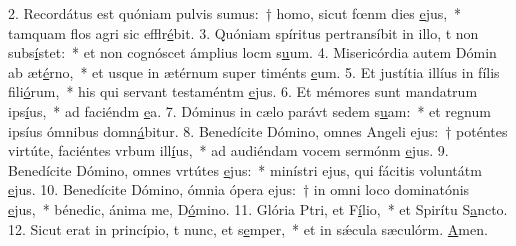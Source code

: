 2. Recordátus est quóniam pulvis sumus:~† homo, sicut fœnm dies \uline{e}jus,~* tamquam flos agri sic efflr\uline{é}bit.
3. Quóniam spíritus pertransíbit in illo, t non subs\uline{í}stet:~* et non cognóscet ámplius locm s\uline{u}um.
4. Misericórdia autem Dómin ab æt\uline{é}rno,~* et usque in ætérnum super timénts \uline{e}um.
5. Et justítia illíus in fílis fili\uline{ó}rum,~* his qui servant testaméntm \uline{e}jus.
6. Et mémores sunt mandatrum ips\uline{í}us,~* ad faciéndm \uline{e}a.
7. Dóminus in cælo parávt sedem s\uline{u}am:~* et regnum ipsíus ómnibus domn\uline{á}bitur.
8. Benedícite Dómino, omnes Angeli ejus:~† poténtes virtúte, faciéntes vrbum ill\uline{í}us,~* ad audiéndam vocem sermónm \uline{e}jus.
9. Benedícite Dómino, omnes vrtútes \uline{e}jus:~* minístri ejus, qui fácitis voluntátm \uline{e}jus.
10. Benedícite Dómino, ómnia ópera ejus:~† in omni loco dominatónis \uline{e}jus,~* bénedic, ánima me, D\uline{ó}mino.
11. Glória Ptri, et F\uline{í}lio,~* et Spirítu S\uline{a}ncto.
12. Sicut erat in princípio, t nunc, et s\uline{e}mper,~* et in sǽcula sæculórm. \uline{A}men.
